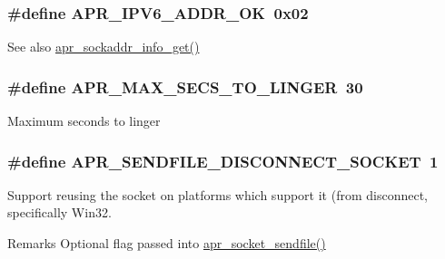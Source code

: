 \subsubsection[{\texorpdfstring{A\+P\+R\+\_\+\+I\+P\+V6\+\_\+\+A\+D\+D\+R\+\_\+\+OK}{APR_IPV6_ADDR_OK}}]{\setlength{\rightskip}{0pt plus 5cm}\#define A\+P\+R\+\_\+\+I\+P\+V6\+\_\+\+A\+D\+D\+R\+\_\+\+OK~0x02}\hypertarget{group__apr__network__io_gaef1f70f9b969d25832a230f429837207}{}\label{group__apr__network__io_gaef1f70f9b969d25832a230f429837207}
\begin{DoxySeeAlso}{See also}
\hyperlink{group__apr__network__io_gaa2f399ca2b60b35c0abf7630298c6c9f}{apr\+\_\+sockaddr\+\_\+info\+\_\+get()} 
\end{DoxySeeAlso}
\subsubsection[{\texorpdfstring{A\+P\+R\+\_\+\+M\+A\+X\+\_\+\+S\+E\+C\+S\+\_\+\+T\+O\+\_\+\+L\+I\+N\+G\+ER}{APR_MAX_SECS_TO_LINGER}}]{\setlength{\rightskip}{0pt plus 5cm}\#define A\+P\+R\+\_\+\+M\+A\+X\+\_\+\+S\+E\+C\+S\+\_\+\+T\+O\+\_\+\+L\+I\+N\+G\+ER~30}\hypertarget{group__apr__network__io_ga8311c84f6946742188a6b9a45e92ea8e}{}\label{group__apr__network__io_ga8311c84f6946742188a6b9a45e92ea8e}
Maximum seconds to linger 
\subsubsection[{\texorpdfstring{A\+P\+R\+\_\+\+S\+E\+N\+D\+F\+I\+L\+E\+\_\+\+D\+I\+S\+C\+O\+N\+N\+E\+C\+T\+\_\+\+S\+O\+C\+K\+ET}{APR_SENDFILE_DISCONNECT_SOCKET}}]{\setlength{\rightskip}{0pt plus 5cm}\#define A\+P\+R\+\_\+\+S\+E\+N\+D\+F\+I\+L\+E\+\_\+\+D\+I\+S\+C\+O\+N\+N\+E\+C\+T\+\_\+\+S\+O\+C\+K\+ET~1}\hypertarget{group__apr__network__io_gaca378d0e24b1588e3fdb143e4ea9090d}{}\label{group__apr__network__io_gaca378d0e24b1588e3fdb143e4ea9090d}
Support reusing the socket on platforms which support it (from disconnect, specifically Win32. \begin{DoxyRemark}{Remarks}
Optional flag passed into \hyperlink{group__apr__network__io_ga3d93e6212c4c27f2390b0057f8f4a8be}{apr\+\_\+socket\+\_\+sendfile()} 
\end{DoxyRemark}
